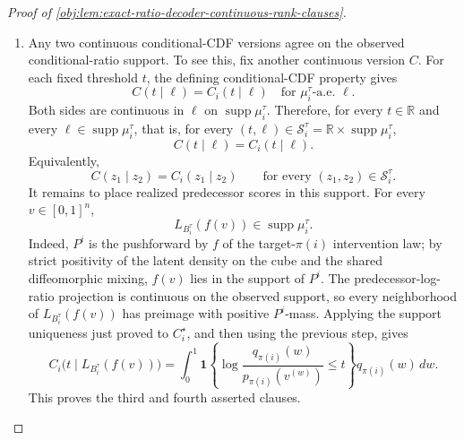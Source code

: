 \begin{proof}[Proof of \cref{obj:lem:exact-ratio-decoder-continuous-rank-clauses}]
\begin{enumerate}
\item Any two continuous conditional-CDF versions agree on the observed conditional-ratio support.  To see this, fix another continuous version \(C\).  For each fixed threshold \(t\), the defining conditional-CDF property gives
\[
C(t\mid\ell)=C_i(t\mid\ell)
\quad\text{for }\mu_i^\tau\text{-a.e. }\ell .
\]
Both sides are continuous in \(\ell\) on \(\operatorname{supp}\mu_i^\tau\).  Therefore, for every \(t\in\mathbb R\) and every \(\ell\in\operatorname{supp}\mu_i^\tau\), that is, for every \((t,\ell)\in\mathcal S_i^\tau=\mathbb R\times\operatorname{supp}\mu_i^\tau\),
\[
C(t\mid\ell)=C_i(t\mid\ell).
\]
Equivalently,
\[
C(z_1\mid z_2)=C_i(z_1\mid z_2)
\qquad
\text{for every }(z_1,z_2)\in\mathcal S_i^\tau .
\]
It remains to place realized predecessor scores in this support.  For every \(v\in[0,1]^n\),
\[
L_{B_i^\tau}(f(v))
\in
\operatorname{supp}\mu_i^\tau .
\]
Indeed, \(P^i\) is the pushforward by \(f\) of the target-\(\pi(i)\) intervention law; by strict positivity of the latent density on the cube and the shared diffeomorphic mixing, \(f(v)\) lies in the support of \(P^i\).  The predecessor-log-ratio projection is continuous on the observed support, so every neighborhood of \(L_{B_i^\tau}(f(v))\) has preimage with positive \(P^i\)-mass.  Applying the support uniqueness just proved to \(C_i^\star\), and then using the previous step, gives
\[
C_i\bigl(t\mid L_{B_i^\tau}(f(v))\bigr)
=
\int_0^1
\mathbf 1\!\left\{
\log\frac{q_{\pi(i)}(w)}
{p_{\pi(i)}(v^{(w)})}\le t
\right\}
q_{\pi(i)}(w)\,dw .
\]
This proves the third and fourth asserted clauses. %


\end{enumerate}
\end{proof}

